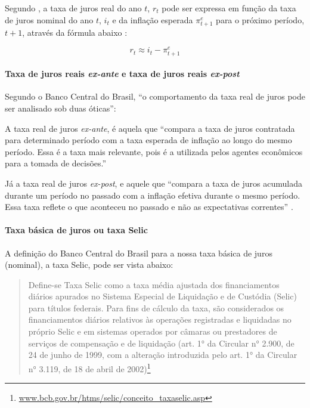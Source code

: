 \documentclass[]{article}
\let\oldparagraph\paragraph
\renewcommand{\paragraph}[1]{\oldparagraph{#1}\mbox{}}
\let\rmarkdownfootnote\footnote%
\def\footnote{\protect\rmarkdownfootnote}
\begin{document}
Segundo , a taxa de juros real do ano \(t\),
\(r_t\) pode ser expressa em função da taxa de juros nominal do ano
\(t\), \(i_t\) e da inflação esperada \(\pi_{t+1}^e\) para o próximo
período, \(t+1\), através da fórmula abaixo \cite[p.~276]{blanchard}:

\[r_t\approx i_t - \pi_{t+1}^e\]

\paragraph{\texorpdfstring{Taxa de juros reais \emph{ex-ante} e taxa de
juros reais
\emph{ex-post}}{Taxa de juros reais ex-ante e taxa de juros reais ex-post}}\label{taxa-de-juros-reais-ex-ante-e-taxa-de-juros-reais-ex-post}

Segundo o Banco Central do Brasil, ``o comportamento da taxa real de
juros pode ser analisado sob duas óticas'':

A taxa real de juros \emph{ex-ante}, é aquela que ``compara a taxa de
juros contratada para determinado período com a taxa esperada de
inflação ao longo do mesmo período. Essa é a taxa mais relevante, pois é
a utilizada pelos agentes econômicos para a tomada de decisões.''
\cite[p.~52]{ri}

Já a taxa real de juros \emph{ex-post}, e aquele que ``compara a taxa de
juros acumulada durante um período no passado com a inflação efetiva
durante o mesmo período. Essa taxa reflete o que aconteceu no passado e
não as expectativas correntes'' \cite[p.~52-53]{ri}.

\paragraph{Taxa básica de juros ou taxa
Selic}\label{taxa-basica-de-juros-ou-taxa-selic}

A definição do Banco Central do Brasil para a nossa taxa básica de juros
(nominal), a taxa Selic, pode ser vista abaixo:

\begin{quote}
Define-se Taxa Selic como a taxa média ajustada dos financiamentos
diários apurados no Sistema Especial de Liquidação e de Custódia (Selic)
para títulos federais. Para fins de cálculo da taxa, são considerados os
financiamentos diários relativos às operações registradas e liquidadas
no próprio Selic e em sistemas operados por câmaras ou prestadores de
serviços de compensação e de liquidação (art. 1° da Circular n° 2.900,
de 24 de junho de 1999, com a alteração introduzida pelo art. 1° da
Circular n° 3.119, de 18 de abril de 2002)\footnote{\href{http://www.bcb.gov.br/htms/selic/conceito_taxaselic.asp}{www.bcb.gov.br/htms/selic/conceito\_taxaselic.asp}}
\end{quote}
\end{document}
